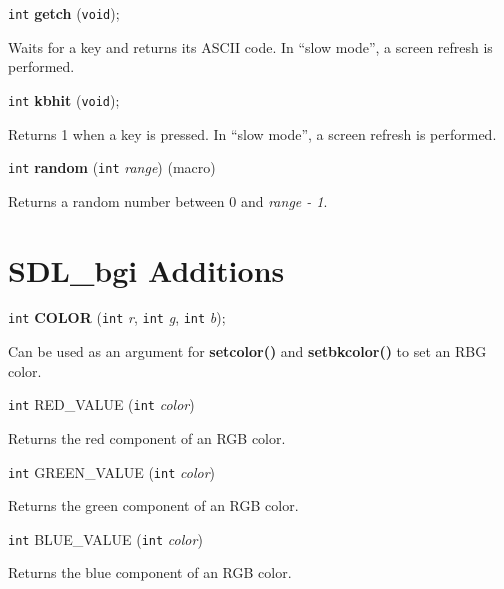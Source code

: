 \documentclass[a4paper,11pt]{article}
\newcommand{\SDLbgi}{SDL\_bgi}
\newcommand{\V}{\texttt{void}}      %
\newcommand{\I}{\texttt{int}}       %
\newcommand{\func}[1]{\textbf{#1}}  %
\newcommand{\A}[1]{\emph{#1}}       %
\newenvironment{bgi}
{ %
  \begin{snugshade}
}
{ %
  \end{snugshade}
}
\begin{document}

\begin{bgi}
\I{} \func{getch} (\V{});
\end{bgi}

Waits for a key and returns its ASCII code. In ``slow mode'', a screen
refresh is performed.


\begin{bgi}
\I{} \func{kbhit} (\V{});
\end{bgi}

Returns 1 when a key is pressed. In ``slow mode'', a screen refresh is
performed.


\begin{bgi}
\I{} \func{random} (\I{} \A{range}) (macro)
\end{bgi}

Returns a random number between 0 and \A{range - 1}.

	
\section{\SDLbgi{} Additions}

\begin{bgi}
\I{} \func{COLOR} (\I{} \A{r}, \I{} \A{g}, \I{} \A{b});
\end{bgi}

Can be used as an argument for \func{setcolor()} and
\func{setbkcolor()} to set an RBG color.


\begin{bgi}
\I{} RED\_VALUE (\I{} \A{color})
\end{bgi}

Returns the red component of an RGB color.


\begin{bgi}
\I{} GREEN\_VALUE (\I{} \A{color})
\end{bgi}

Returns the green component of an RGB color.


\begin{bgi}
\I{} BLUE\_VALUE (\I{} \A{color})
\end{bgi}

Returns the blue component of an RGB color.

\end{document}
